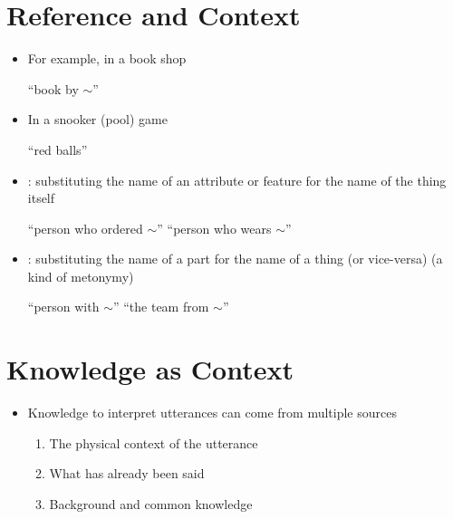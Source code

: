 \documentclass[headrule,footrule]{foils}
\begin{document}
\section{Reference and Context}
\MyLogo{}




\begin{itemize}%
\item For example, in a book shop
  \begin{exe}
    \ex {} \textnormal{``book by $\sim$''}
  \end{exe}
\item In a snooker (pool)  game
  \begin{exe}
    \ex {} ``red balls''
  \end{exe}
  \newpage
\item {}: substituting the name of an attribute or feature for the name of the thing itself
  \begin{exe}
    \ex {} ``person who ordered $\sim$''
    \ex {} ``person who wears $\sim$''
  \end{exe}
  \item {}: substituting the name of a part for the name of a thing (or vice-versa)
    (a kind of metonymy)
  \begin{exe}
    \ex {} ``person with $\sim$''
    \ex {} ``the team from $\sim$''
  \end{exe}
\end{itemize}

\section{Knowledge as Context}

\begin{itemize}
\item Knowledge to interpret utterances can come from multiple sources
  \begin{enumerate}
  \item The physical context of the utterance
    \\ 
  \item What has already been said
    \\ 
  \item Background and common knowledge
    \\ 
  \end{enumerate}
\end{itemize}
\end{document}
